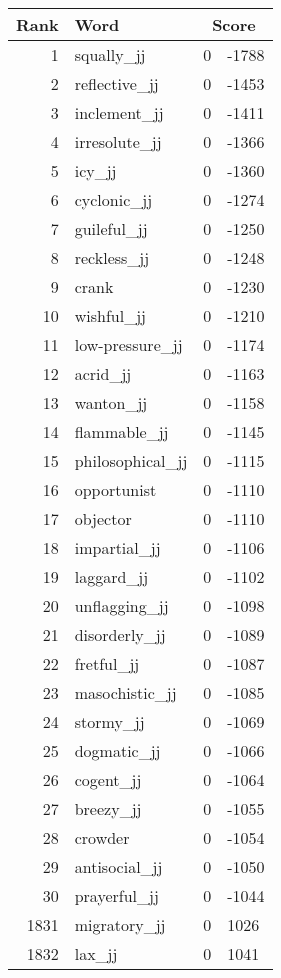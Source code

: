 \begin{longtable}[!htbp]{| rlr@{.}l |}
    \hline
    \textbf{Rank} & \textbf{Word} & \multicolumn{2}{c|}{\textbf{Score}} \\
    \hline
    \endhead
    1 & squally\_jj & 0 & -1788 \\
    2 & reflective\_jj & 0 & -1453 \\
    3 & inclement\_jj & 0 & -1411 \\
    4 & irresolute\_jj & 0 & -1366 \\
    5 & icy\_jj & 0 & -1360 \\
    6 & cyclonic\_jj & 0 & -1274 \\
    7 & guileful\_jj & 0 & -1250 \\
    8 & reckless\_jj & 0 & -1248 \\
    9 & crank & 0 & -1230 \\
    10 & wishful\_jj & 0 & -1210 \\
    11 & low-pressure\_jj & 0 & -1174 \\
    12 & acrid\_jj & 0 & -1163 \\
    13 & wanton\_jj & 0 & -1158 \\
    14 & flammable\_jj & 0 & -1145 \\
    15 & philosophical\_jj & 0 & -1115 \\
    16 & opportunist & 0 & -1110 \\
    17 & objector & 0 & -1110 \\
    18 & impartial\_jj & 0 & -1106 \\
    19 & laggard\_jj & 0 & -1102 \\
    20 & unflagging\_jj & 0 & -1098 \\
    21 & disorderly\_jj & 0 & -1089 \\
    22 & fretful\_jj & 0 & -1087 \\
    23 & masochistic\_jj & 0 & -1085 \\
    24 & stormy\_jj & 0 & -1069 \\
    25 & dogmatic\_jj & 0 & -1066 \\
    26 & cogent\_jj & 0 & -1064 \\
    27 & breezy\_jj & 0 & -1055 \\
    28 & crowder & 0 & -1054 \\
    29 & antisocial\_jj & 0 & -1050 \\
    30 & prayerful\_jj & 0 & -1044 \\
    1831 & migratory\_jj & 0 & 1026 \\
    1832 & lax\_jj & 0 & 1041 \\

\end{longtable}
